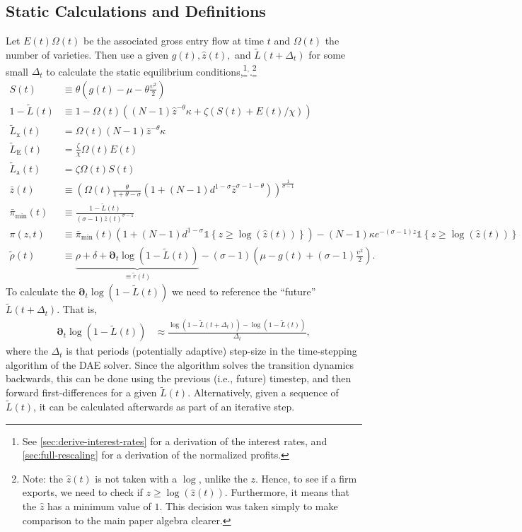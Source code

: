 \documentclass[11pt]{article}
\newcommand{\D}[1][]{\ensuremath{\boldsymbol{\partial}_{#1}}}
\newcommand{\indicator}[1]{\ensuremath{\mathds{1}\left\{{#1}\right\}}}
\begin{document}
\subsection{Static Calculations and Definitions}
Let $E(t)\Omega(t)$ be the associated gross entry flow at time $t$ and $\Omega(t)$ the number of varieties.  Then use a given $g(t), \hat{z}(t),$ and  $\tilde{L}(t+\Delta_t)$ for some small $\Delta_t$ to calculate the static equilibrium conditions,\footnote{See \cref{sec:derive-interest-rates} for a derivation of the interest rates, and \cref{sec:full-rescaling} for a derivation of the normalized profits.}${}^{,}$.\footnote{Note: the $\hat{z}(t)$ is not taken with a $\log$, unlike the $z$.  Hence, to see if a firm exports, we need to check if $z \geq \log(\hat{z}(t))$.  Furthermore, it means that the $\hat{z}$ has a minimum value of $1$.  This decision was taken simply to make comparison to the main paper algebra clearer.}
\begin{align}
	S(t) &\equiv \theta \left( g(t) - \mu - \theta\frac{\upsilon^2}{2}\right)\\
	1 - \tilde{L}(t) &\equiv 1 - \Omega(t)\left((N -1)\hat{z}^{-\theta}\kappa + \zeta \left(S(t) + E(t)/\chi \right)\right)\\
	\tilde{L}_{\text{x}}(t) &= \Omega(t) (N -1)\hat{z}^{-\theta}\kappa\\
	\tilde{L}_{\text{E}}(t) &= \frac{\zeta}{\chi}\Omega(t) E(t)\\
	\tilde{L}_{\text{a}}(t) &= \zeta \Omega(t) S(t)\\
	\bar{z}(t)&\equiv \left(\Omega(t)
\frac{\theta}{1+\theta - \sigma}\left(1 + (N-1)d^{1-\sigma}\hat{z}^{\sigma - 1 -\theta} \right)\right)^{\frac{1}{\sigma - 1}}\\
	\bar{\pi}_{\min}(t) &\equiv \frac{1-\tilde{L}(t)}{(\sigma-1)\bar{z}(t)^{\sigma-1}}\\
	\pi(z,t) &\equiv \bar{\pi}_{\min}(t)\left(1 + (N-1)d^{1-\sigma}\indicator{z \geq \log(\hat{z}(t))}\right) - (N-1)\kappa e^{-(\sigma - 1)z}\indicator{z \geq \log(\hat{z}(t))}\\
	\tilde{\rho}(t) &\equiv \underbrace{\rho+ \delta + \D[t]\log\left(1 - \tilde{L}(t)\right)}_{\equiv \tilde{r}(t)} - (\sigma - 1)\left(\mu - g(t) + (\sigma - 1)\frac{\upsilon^2}{2} \right).
\end{align}
To calculate the $\D[t]\log\left(1 - \tilde{L}(t)\right)$ we need to reference the ``future'' $\tilde{L}(t+\Delta_t)$. That is,
\begin{align}
	\D[t]\log\left(1 - \tilde{L}(t)\right) &\approx \frac{\log\left(1 - \tilde{L}(t+\Delta_t)\right) - \log\left(1 - \tilde{L}(t)\right)}{\Delta_t},
\end{align}
where the $\Delta_t$ is that periods (potentially adaptive) step-size in the time-stepping algorithm of the DAE solver.  Since the algorithm solves the transition dynamics backwards, this can be done using the previous (i.e., future) timestep, and then forward first-differences for a given $\tilde{L}(t)$.   Alternatively, given a sequence of $\tilde{L}(t)$, it can be calculated afterwards as part of an iterative step.
\end{document}
